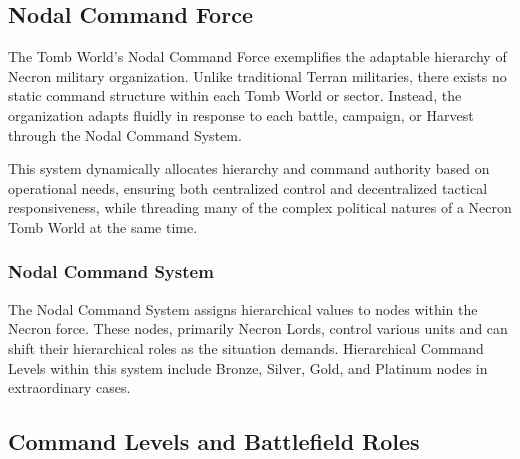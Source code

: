\begin{multicols}{2}
\subsection{Nodal Command Force}

The Tomb World's Nodal Command Force exemplifies the adaptable hierarchy of Necron military organization. Unlike traditional Terran militaries, there exists no static command structure within each Tomb World or sector. Instead, the organization adapts fluidly in response to each battle, campaign, or Harvest through the Nodal Command System. 

This system dynamically allocates hierarchy and command authority based on operational needs, ensuring both centralized control and decentralized tactical responsiveness, while threading many of the complex political natures of a Necron Tomb World at the same time.


\subsubsection{Nodal Command System}

The Nodal Command System assigns hierarchical values to nodes within the Necron force. These nodes, primarily Necron Lords, control various units and can shift their hierarchical roles as the situation demands. Hierarchical Command Levels within this system include Bronze, Silver, Gold, and Platinum nodes in extraordinary cases.


\subsection{Command Levels and Battlefield Roles}


\end{multicols}

